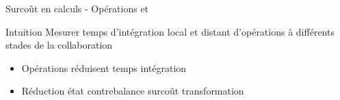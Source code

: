 \begin{frame}{Surcoût en calculs - Opérations \ins et \rmv}
    \begin{block}{Intuition}
        Mesurer temps d'intégration \alert{local} et \alert{distant} d'opérations \ins à différents stades de la collaboration
    \end{block}
    \pause
    \vspace{-0.5cm}
    \begin{figure}[!ht]
        \centering
    \end{figure}
    \vspace{-0.3cm}
    \begin{itemize}
        \item<3-> Opérations \ren réduisent temps intégration
        \item<4> Réduction état contrebalance surcoût transformation
    \end{itemize}
\end{frame}

